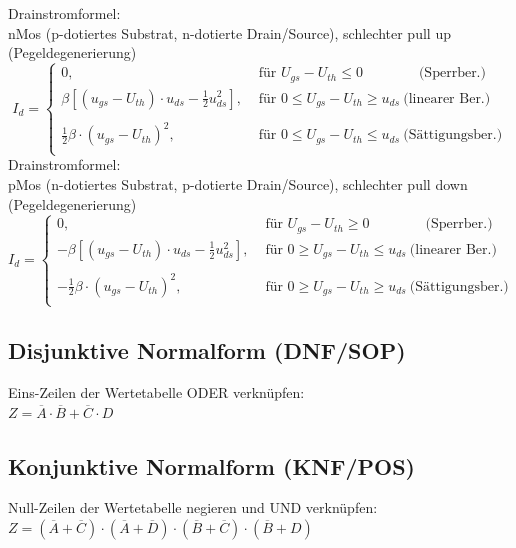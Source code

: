\documentclass[6pt,a4paper]{scrartcl}
\newcommand{\ol}[1]{\ensuremath{\overline{#1}}}									%
\begin{document}
\begin{multicols}{3}
	Drainstromformel:\\
	nMos (p-dotiertes Substrat, n-dotierte Drain/Source), schlechter pull up (Pegeldegenerierung)
	\begin{equation*}
	\!\!\! I_d = \begin{cases}
	0, &\text{ für }  U_{gs} - U_{th} \le 0 \qquad \qquad  \text{(Sperrber.)}\\[0.2em]
	 \beta [(u_{gs} - U_{th}) \cdot u_{ds} - \frac{1}{2} u_{ds}^2] , &\text{ für }  0 \le U_{gs} - U_{th} \ge u_{ds} \  \text{(linearer Ber.)}\\\\[0.2em]
	 \frac{1}{2} \beta \cdot (u_{gs} - U_{th})^2, &\text{ für }  0 \le U_{gs} - U_{th} \le u_{ds} \  \text{(Sättigungsber.)}\\

	\end{cases}
	\end{equation*}
	Drainstromformel: \\
	pMos (n-dotiertes Substrat, p-dotierte Drain/Source), schlechter pull down (Pegeldegenerierung)
	\begin{equation*}
	\!\!\! I_d = \begin{cases}
	0, &\text{ für }  U_{gs} - U_{th} \ge 0 \qquad \qquad  \text{(Sperrber.)}\\[0.2em]
	- \beta [(u_{gs} - U_{th}) \cdot u_{ds} - \frac{1}{2} u_{ds}^2] , &\text{ für }  0 \ge U_{gs} - U_{th} \le u_{ds} \  \text{(linearer Ber.)}\\\\[0.2em]
	- \frac{1}{2} \beta \cdot (u_{gs} - U_{th})^2, &\text{ für }  0 \ge U_{gs} - U_{th} \ge u_{ds} \  \text{(Sättigungsber.)}\\

	\end{cases}
	\end{equation*}



\subsection{Disjunktive Normalform (DNF/SOP)}
Eins-Zeilen der Wertetabelle ODER verknüpfen: \\
$Z = \overline A \cdot \overline B + \overline C \cdot D$

\subsection{Konjunktive Normalform (KNF/POS)}
Null-Zeilen der Wertetabelle negieren und UND verknüpfen: \\	
$Z = ( \ol A + \ol C) \cdot ( \ol A + \ol D) \cdot ( \ol B + \ol C) \cdot ( \ol B + D)$


\end{multicols}
\end{document}

